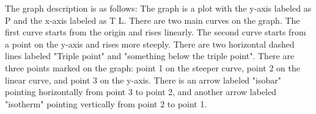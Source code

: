 The graph description is as follows: The graph is a plot with the y-axis labeled as P and the x-axis labeled as T L. There are two main curves on the graph. The first curve starts from the origin and rises linearly. The second curve starts from a point on the y-axis and rises more steeply. There are two horizontal dashed lines labeled "Triple point" and "something below the triple point". There are three points marked on the graph: point 1 on the steeper curve, point 2 on the linear curve, and point 3 on the y-axis. There is an arrow labeled "isobar" pointing horizontally from point 3 to point 2, and another arrow labeled "isotherm" pointing vertically from point 2 to point 1.